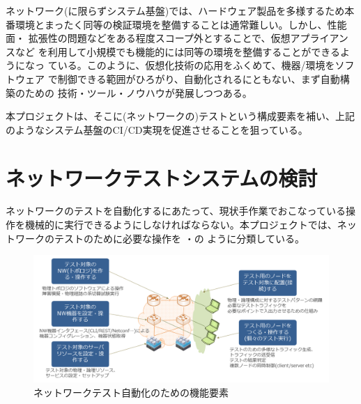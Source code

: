 ネットワーク(に限らずシステム基盤)では、ハードウェア製品を多様するため本
番環境とまったく同等の検証環境を整備することは通常難しい。しかし、性能面・
拡張性の問題などをある程度スコープ外とすることで、仮想アプライアンスなど
を利用して小規模でも機能的には同等の環境を整備することができるようになっ
ている。このように、仮想化技術の応用をふくめて、機器/環境をソフトウェア
で制御できる範囲がひろがり、自動化されるにともない、まず自動構築のための
技術・ツール・ノウハウが発展しつつある。

本プロジェクトは、そこに(ネットワークの)テストという構成要素を補い、上記
のようなシステム基盤のCI/CD実現を促進させることを狙っている。

 \section{ネットワークテストシステムの検討}
 \label{sec:discuss-network-test}


ネットワークのテストを自動化するにあたって、現状手作業でおこなっている操
作を機械的に実行できるようにしなければならない。本プロジェクトでは、ネッ
トワークのテストのために必要な操作を
・の
ように分類している。

\begin{figure}[h]
 \centering
 \includegraphics[scale=0.5]{img/features-of-network-testing.png}
 \caption{ネットワークテスト自動化のための機能要素}
 \label{fig:features-of-network-testing}
\end{figure}

